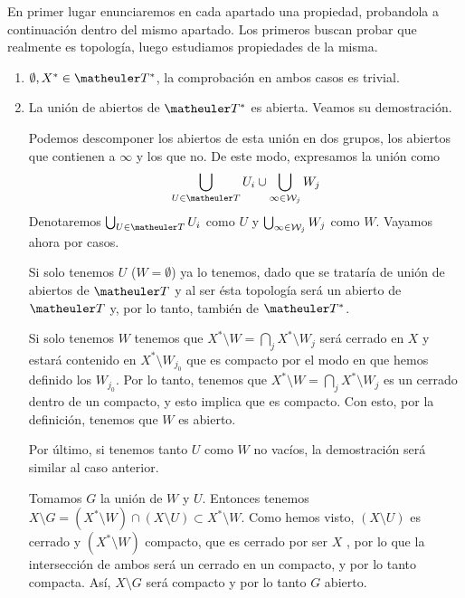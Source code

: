 \begin{obs}En primer lugar enunciaremos en cada apartado una propiedad, probandola a continuación dentro del mismo apartado. Los primeros buscan probar que realmente es topología, luego estudiamos propiedades de la misma.
	
	\begin{enumerate}
		\item $\emptyset,X^*\in \T^*$, la comprobación en ambos casos es trivial. 
		\item La unión de abiertos de $\T^*$ es abierta. Veamos su demostración.
		
		Podemos descomponer los abiertos de esta unión en dos grupos, los abiertos que contienen a $\infty$ y los que no. De este modo, expresamos la unión como 
		\begin{equation}
		\bigcup_{U\in\T}U_i \cup \bigcup_{\infty\in\W_j}W_j
		\end{equation}
		Denotaremos $\bigcup_{U\in\T}U_i$ como $U$ y $\bigcup_{\infty\in\mathcal{W}_j}W_j$ como $W$. Vayamos ahora por casos.
		
		Si solo tenemos $U$ ($W=\emptyset$) ya lo tenemos, dado que se trataría de unión de abiertos de $\T$ y al ser ésta topología será un abierto de $\T$ y, por lo tanto, también de $\T^*$.
		
		
		Si solo tenemos $W$ tenemos que $X^*\setminus W=\bigcap_j X^*\setminus W_j$ será cerrado en $X$ y estará contenido en $X^*\setminus W_{j_0}$ que es compacto por el modo en que hemos definido los $W_{j_0}$. Por lo tanto, tenemos que  $X^*\setminus W=\bigcap_j X^*\setminus W_j$ es un cerrado dentro de un compacto, y esto implica que es compacto. Con esto, por la definición, tenemos que $W$ es abierto.
		
		Por último, si tenemos tanto $U$ como $W$ no vacíos, la demostración será similar al caso anterior. 
		
		Tomamos $G$ la unión de $W$ y $U$. Entonces tenemos $X\setminus G= (X^*\setminus W)\cap(X\setminus U)\subset X^*\setminus W$.
		Como hemos visto, $(X\setminus U)$ es cerrado y $(X^*\setminus W)$ compacto, que es cerrado por ser $X$ \hausdorff, por lo que la intersección de ambos será un cerrado en un compacto, y por lo tanto compacta. Así, $X\setminus G$ será compacto y por lo tanto $G$ abierto.
		

\end{enumerate}
\end{obs}
